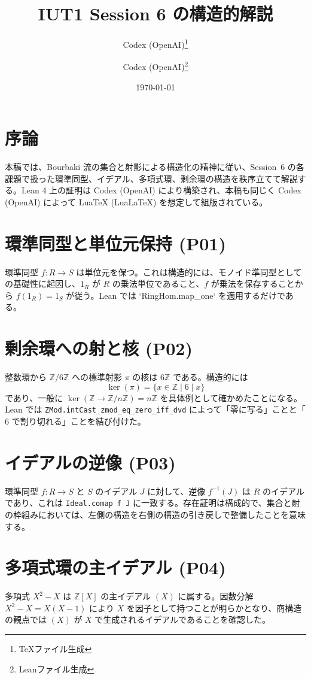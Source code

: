 \documentclass[12pt]{ltjsarticle}
\title{IUT1 Session 6 の構造的解説}
\author{Codex (OpenAI)\thanks{TeXファイル生成}\and Codex (OpenAI)\thanks{Leanファイル生成}}
\date{\today}
\theoremstyle{definition}
\theoremstyle{remark}
\begin{document}
\maketitle

\section{序論}
本稿では、Bourbaki 流の集合と射影による構造化の精神に従い、Session~6 の各課題で扱った環準同型、イデアル、多項式環、剰余環の構造を秩序立てて解説する。Lean 4 上の証明は Codex (OpenAI) により構築され、本稿も同じく Codex (OpenAI) によって Lua\TeX{} (LuaLaTeX) を想定して組版されている。

\section{環準同型と単位元保持 (P01)}
環準同型 $f \colon R \to S$ は単位元を保つ。これは構造的には、モノイド準同型としての基礎性に起因し、$1_R$ が $R$ の乗法単位であること、$f$ が乗法を保存することから $f(1_R) = 1_S$ が従う。Lean では `RingHom.map_one` を適用するだけである。

\section{剰余環への射と核 (P02)}
整数環から $\mathbb{Z}/6\mathbb{Z}$ への標準射影 $\pi$ の核は $6\mathbb{Z}$ である。構造的には
\[
  \ker(\pi) = \{ x \in \mathbb{Z} \mid 6 \mid x \}
\]
であり、一般に $\ker(\mathbb{Z} \to \mathbb{Z}/n\mathbb{Z}) = n\mathbb{Z}$ を具体例として確かめたことになる。Lean では \texttt{ZMod.intCast\_zmod\_eq\_zero\_iff\_dvd} によって「零に写る」ことと「$6$ で割り切れる」ことを結び付けた。

\section{イデアルの逆像 (P03)}
環準同型 $f \colon R \to S$ と $S$ のイデアル $J$ に対して、逆像 $f^{-1}(J)$ は $R$ のイデアルであり、これは \texttt{Ideal.comap f J} に一致する。存在証明は構成的で、集合と射の枠組みにおいては、左側の構造を右側の構造の引き戻しで整備したことを意味する。

\section{多項式環の主イデアル (P04)}
多項式 $X^2 - X$ は $\mathbb{Z}[X]$ の主イデアル $(X)$ に属する。因数分解 $X^2 - X = X(X-1)$ により $X$ を因子として持つことが明らかとなり、商構造の観点では $(X)$ が $X$ で生成されるイデアルであることを確認した。
\end{document}
